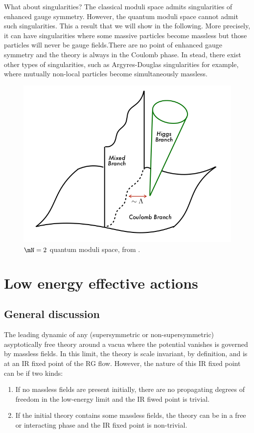 \documentclass{worksheetclass}
\begin{document}
        What about singularities? The classical moduli space admits singularities of enhanced gauge symmetry. However, the quantum moduli space cannot admit such singularities. This a result that we will show in the following. More precisely, it can have singularities where some massive particles become massless but those particles will never be gauge fields.There are no point of enhanced gauge symmetry and the theory is always in the Coulomb phase. In stead, there exist other types of singularities, such as Argyres-Douglas singularities for example, where mutually non-local particles become simultaneously massless.

        \begin{figure}[H]
            \centering
            \includegraphics[scale=0.35]{Pictures/quantummodulispace.png}
            \caption{$\mN=2$ quantum moduli space, from \cite{bertolinisusy}.}
        \end{figure}

\section{Low energy effective actions}

    \subsection{General discussion}

        The leading dynamic of any (supersymmetric or non-supersymmetric) asyptotically free theory around a vacua where the potential vanishes is governed by massless fields. In this limit, the theory is scale invariant, by definition, and is at an IR fixed point of the RG flow. However, the nature of this IR fixed point can be if two kinds:
        \begin{enumerate}
            \item If no massless fields are present initially, there are no propagating degrees of freedom in the low-energy limit and the IR fiwed point is trivial.
            \item If the initial theory contains some massless fields, the theory can be in a free or interacting phase and the IR fixed point is non-trivial.
        \end{enumerate}
        
\end{document}
